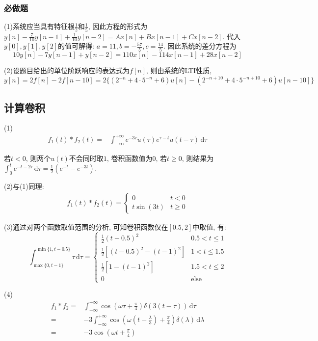 \subsubsection{必做题}

(1)系统应当具有特征根$\frac{1}{2}$和$\frac{1}{5}$, 因此方程的形式为$y[n]-\frac{7}{10}
y[n-1]+\frac{1}{10}y[n-2]=Ax[n]+Bx[n-1]+Cx[n-2]$. 代入$y[0],y[1],y[2]$的值可解得:
$a=11, b=-\frac{57}{5},c=\frac{14}{5}$. 因此系统的差分方程为$$10y[n]-7y[n-1]+y[n-
2]=110x[n]-114x[n-1]+28x[n-2]$$

(2)设题目给出的单位阶跃响应的表达式为$f[n]$, 则由系统的LTI性质, $y[n]=2f[n]-2f[n-10]
=2\{(2^{-n}+4\cdot5^{-n}+6)u[n]-(2^{-n+10}+4\cdot5^{-n+10}+6)u[n-10]\}$



\subsection{计算卷积}

(1) 
\begin{align*}
    f_1(t)*f_2(t)=&\int_{-\infty}^{+\infty}e^{-3\tau}u(\tau)e^{\tau-t}u(t-\tau)
    \,\mathrm{d}\tau
\end{align*}

若$t<0$, 则两个$u(t)$不会同时取$1$, 卷积函数值为$0$, 若$t\ge0$, 则结果为$\int_{0}^
{t}e^{-t-2\tau}\,\mathrm{d}\tau=\frac{1}{2}(e^{-t}-e^{-3t})$.

(2)与(1)同理: 
\begin{align*}
    f_1(t)*f_2(t)=\left\{\begin{array}{ll}
        0 &t<0 \\
        t\sin(3t)& t\ge0
    \end{array}\right.
\end{align*}

(3)通过对两个函数取值范围的分析, 可知卷积函数仅在$[0.5,2]$中取值, 有:
$$\int_{\max\{0,t-1\}}^{\min\{1,t-0.5\}}\tau\,\mathrm{d}\tau=
\left\{\begin{array}{ll}
    \frac{1}{2}(t-0.5)^2 & 0.5 < t \le 1 \\
    \frac{1}{2}[(t-0.5)^2-(t-1)^2] & 1 < t \le 1.5 \\
    \frac{1}{2}[1-(t-1)^2] & 1.5 < t \le 2 \\
    0 & \text{else}
\end{array}\right.$$

(4)\begin{align*}
    f_1*f_2=&\int_{-\infty}^{+\infty}\cos(\omega \tau+\frac{\pi}{4})\delta(3(t-\tau))\,\mathrm{d}\tau \\
    =&-3\int_{-\infty}^{+\infty}\cos(\omega(t-\frac{\lambda}{3})+\frac{\pi}{4})\delta(\lambda)\,\mathrm{d}\lambda \\
    =&-3\cos(\omega t+\frac{\pi}{4})
\end{align*}


